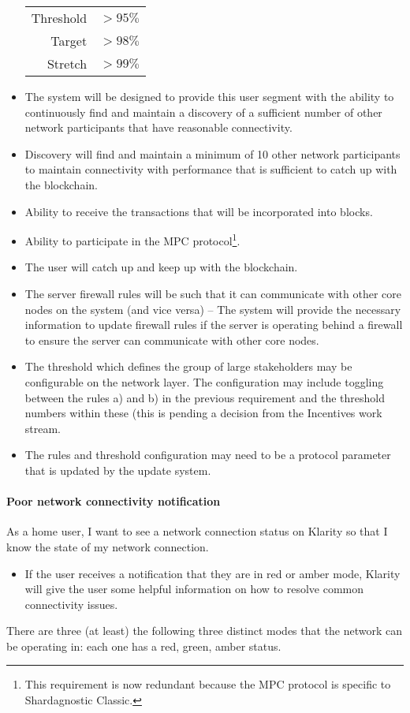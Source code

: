 \begin{itemize}
      \begin{tabular}{rl}
      Threshold & $>95\%$ \\
      Target    & $>98\%$ \\
      Stretch   & $>99\%$
      \end{tabular}
\item The system will be designed to provide this user segment with the ability
      to continuously find and maintain a discovery of a sufficient number of
      other network participants that have reasonable connectivity.
\item Discovery will find and maintain a minimum of 10 other network
      participants to maintain connectivity with performance that is sufficient
      to catch up with the blockchain.
\item Ability to receive the transactions that will be incorporated into blocks.
\item Ability to participate in the MPC protocol\footnote{This requirement is
      now redundant because the MPC protocol is specific to Shardagnostic Classic.}.
\item The user will catch up and keep up with the blockchain.
\item The server firewall rules will be such that it can communicate with other
      core nodes on the system (and vice versa) -- The system will provide the
      necessary information to update firewall rules if the server is operating
      behind a firewall to ensure the server can communicate with other core
      nodes.
\item The threshold which defines the group of large stakeholders may be
      configurable on the network layer. The configuration may include toggling
      between the rules a) and b) in the previous requirement and the threshold
      numbers within these (this is pending a decision from the Incentives
      work stream.
\item The rules and threshold configuration may need to be a protocol parameter
      that is updated by the update system.
\end{itemize}


\paragraph{Poor network connectivity notification}

As a home user, I want to see a network connection status on Klarity so that
I know the state of my network connection.
%
\begin{itemize}
\item If the user receives a notification that they are in red or amber mode,
      Klarity will give the user some helpful information on how to resolve
      common connectivity issues.
\end{itemize}
%
There are three (at least) the following three distinct modes that the network can be operating in:
each one has a red, green, amber status.

